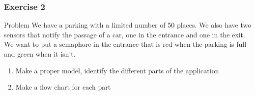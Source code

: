 \begin{frame}
  \frametitle{Exercise 2}
  \begin{block}{Problem}
    We have a parking with a limited number of 50 places. We also have
    two sensors that notify the passage of a car, one in the entrance
    and one in the exit. We want to put a semaphore in the entrance
    that is red when the parking is full and green when it isn't. 
  \end{block}
  \pause
  \begin{enumerate}
  \item Make a proper model, identify the different parts of the application
  \item Make a flow chart for each part
  \end{enumerate}
\end{frame}
